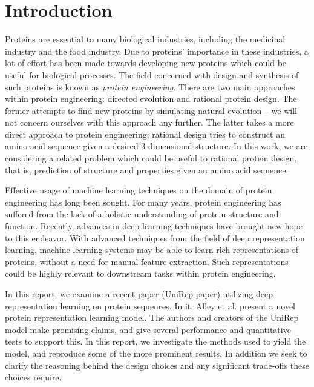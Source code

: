 \documentclass[a4paper,12pt]{article}
\begin{document}


\thispagestyle{empty}
\tableofcontents
\clearpage
\setcounter{page}{1}

\section{Introduction}

Proteins are essential to many biological industries, including the medicinal industry and the food industry. Due to proteins' importance in these industries, a lot of effort has been made towards developing new proteins which could be useful for biological processes. The field concerned with design and synthesis of such proteins is known as \textit{protein engineering}. There are two main approaches within protein engineering: directed evolution and rational protein design. The former attempts to find new proteins by simulating natural evolution -- we will not concern ourselves with this approach any further. The latter takes a more direct approach to protein engineering; rational design tries to construct an amino acid sequence given a desired 3-dimensional structure. In this work, we are considering a related problem which could be useful to rational protein design, that is, prediction of structure and properties given an amino acid sequence.

Effective usage of machine learning techniques on the domain of protein engineering has long been sought. For many years, protein engineering has suffered from the lack of a holistic understanding of protein structure and function. Recently, advances in deep learning techniques have brought new hope to this endeavor. With advanced techniques from the field of deep representation learning, machine learning systems may be able to learn rich representations of proteins, without a need for manual feature extraction. Such representations could be highly relevant to downstream tasks within protein engineering.

In this report, we examine a recent paper \cite{alley2019unified} (UniRep paper) utilizing deep representation learning on protein sequences. In it, Alley et al. present a novel protein representation learning model. The authors and creators of the UniRep model make promising claims, and give several performance and quantitative tests to support this. In this report, we investigate the methods used to yield the model, and reproduce some of the more prominent results. In addition we seek to clarify the reasoning behind the design choices and any significant trade-offs these choices require. 
\end{document}

